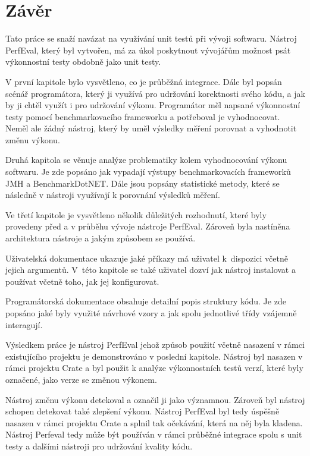 \chapter*{Závěr}

Tato práce se snaží navázat na využívání unit testů při vývoji softwaru.
Nástroj PerfEval, který byl vytvořen, má za úkol poskytnout vývojářům možnost
psát výkonnostní testy obdobně jako unit testy.

V první kapitole bylo vysvětleno, co je průběžná integrace. Dále byl popsán scénář programátora, který
ji využívá pro udržování korektnosti svého kódu, a jak by ji chtěl využít i pro udržování výkonu.
Programátor měl napsané výkonnostní testy pomocí benchmarkovacího frameworku a potřeboval je vyhodnocovat.
Neměl ale žádný nástroj, který by uměl výsledky měření porovnat a vyhodnotit změnu výkonu.

Druhá kapitola se věnuje analýze problematiky kolem vyhodnocování výkonu softwaru. Je zde popsáno jak vypadají výstupy benchmarkovacích frameworků
JMH a BenchmarkDotNET. Dále jsou popsány statistické metody, které se následně v nástroji využívají k porovnání
výsledků měření.

Ve třetí kapitole je vysvětleno několik důležitých rozhodnutí, které byly provedeny před a v průběhu vývoje nástroje PerfEval.
Zároveň byla nastíněna architektura nástroje a jakým způsobem se používá.

Uživatelská dokumentace ukazuje jaké příkazy má uživatel k~dispozici včetně jejich argumentů.
V~této kapitole se také uživatel dozví jak nástroj instalovat a používat včetně toho, jak jej konfigurovat.

Programátorská dokumentace obsahuje detailní popis struktury kódu. Je zde popsáno jaké byly využité návrhové vzory
a jak spolu jednotlivé třídy vzájemně interagují.

Výsledkem práce je nástroj PerfEval jehož způsob použití včetně nasazení v rámci existujícího projektu je demonstrováno
v poslední kapitole. Nástroj byl nasazen v rámci projektu Crate a byl použit k analýze výkonnostních testů verzí, které byly
označené, jako verze se změnou výkonem.

Nástroj změnu výkonu detekoval a označil ji jako významnou. Zároveň byl nástroj schopen detekovat také zlepšení výkonu.
Nástroj PerfEval byl tedy úspěšně nasazen v rámci projektu Crate a splnil tak očekávání, která na něj byla kladena.
Nástroj Perfeval tedy může být používán v rámci průběžné integrace spolu s unit testy a dalšími nástroji pro udržování kvality kódu.